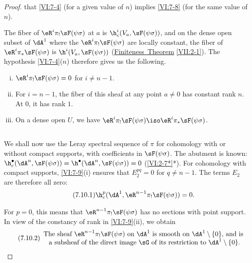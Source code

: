 \documentclass[oneside]{book}
\begin{document}
\begin{proof}[Proof]
that \ref{VI:7-4} (for a given value of $n$) implies \ref{VI:7-8} 
(for the same value of $n$). 

The fiber of $\eR^i \pi_! \sF(\psi\sigma)$ at $a$ is 
$\h_c^i(V_a,\sF(\psi\sigma))$, and on the dense open subset of $\dA^1$ where the 
  $\eR^i \pi_!\sF(\psi\sigma)$ are locally constant, the fiber of 
$\eR^i \pi_\ast \sF(\psi\sigma)$ is $\h^i(V_a,\sF(\psi\sigma))$ 
(\hyperref[VII]{Finiteness\ Theorem} \ref{VII:2-1}). The hypothesis \ref{VI:7-4}($n$) 
therefore gives us the following. 





\begin{lemma_}\label{VI:7-9}
\begin{enumerate}[(i)]
  \item $\eR^i \pi_! \sF(\psi\sigma)=0$ for $i\ne n-1$. 
  \item For $i=n-1$, the fiber of this sheaf at any point $a\ne 0$ has 
    constant rank $n$. At $0$, it has rank $1$. 
  \item On a dense open $U$, we have 
    $\eR^i \pi_! \sF(\psi\sigma) \iso \eR^i \pi_\ast \sF(\psi\sigma)$. 
\end{enumerate}
\end{lemma_}





\subsection{}\label{VI:7-10}

We shall now use the Leray spectral sequence of $\pi$ for 
cohomology with or without compact supports, with coefficients in $\sF(\psi\sigma)$. 
The abutment is known: 
$\h_c^\bullet(\dA^n,\sF(\psi\sigma))=\h^\bullet(\dA^n,\sF(\psi\sigma)) = 0$ 
(\ref{VI:2-7*}*). For cohomology with compact supports, \ref{VI:7-9}(i) ensures that 
$E_2^{pq}=0$ for $q\ne n-1$. The terms $E_2$ are therefore all zero: 
\begin{equation*}\tag{7.10.1}\label{VI:eq:7-10-1}
  \h_c^p(\dA^1,\eR^{n-1} \pi_!\sF(\psi\sigma)) = 0 \text{.} 
\end{equation*}

  For $p=0$, this means that $\eR^{n-1}\pi_! \sF(\psi\sigma)$ has no sections 
with point support. In view of the constancy of rank in \ref{VI:7-9}(ii), we obtain 
\begin{equation*}\tag{7.10.2}\label{VI:eq:7-10-2}
  \begin{array}{c}
    \text{The sheaf $\eR^{n-1} \pi_! \sF(\psi\sigma)$ on $\dA^1$ is smooth on $\dA^1\setminus \{0\}$, and is } \\ 
    \text{a subsheaf of the direct image $\sG$ of its restriction to $\dA^1\setminus \{0\}$.}
  \end{array}
\end{equation*}


\end{proof}
\end{document}
